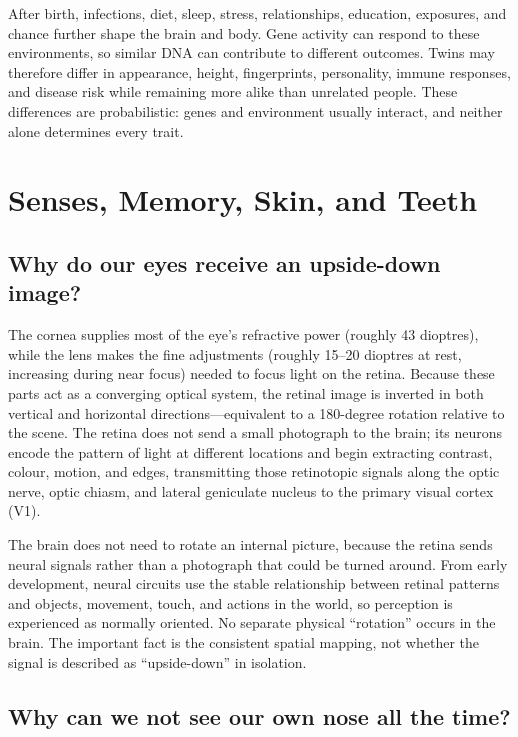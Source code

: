 \documentclass[11pt,oneside]{report}
\begin{document}
After birth, infections, diet, sleep, stress, relationships, education,
exposures, and chance further shape the brain and body. Gene activity can
respond to these environments, so similar DNA can contribute to different
outcomes. Twins may therefore differ in appearance, height, fingerprints,
personality, immune responses, and disease risk while remaining more alike than
unrelated people. These differences are probabilistic: genes and environment
usually interact, and neither alone determines every trait.

\chapter{Senses, Memory, Skin, and Teeth}

\section{Why do our eyes receive an upside-down image?}

The cornea supplies most of the eye's refractive power (roughly 43 dioptres),
while the lens makes the fine adjustments (roughly 15--20 dioptres at rest,
increasing during near focus) needed to focus light on the retina. Because these
parts act as a converging optical system, the retinal image is inverted in both
vertical and horizontal directions---equivalent to a 180-degree rotation
relative to the scene. The retina does not send a small photograph to the
brain; its neurons encode the pattern of light at different locations and
begin extracting contrast, colour, motion, and edges, transmitting those
retinotopic signals along the optic nerve, optic chiasm, and lateral geniculate
nucleus to the primary visual cortex (V1).

The brain does not need to rotate an internal picture, because the retina sends
neural signals rather than a photograph that could be turned around. From early
development, neural circuits use the stable relationship between retinal
patterns and objects, movement, touch, and actions in the world, so perception is
experienced as normally oriented. No separate physical ``rotation'' occurs in the
brain. The important fact is the consistent spatial mapping, not whether the
signal is described as ``upside-down'' in isolation.

\section{Why can we not see our own nose all the time?}
\end{document}
